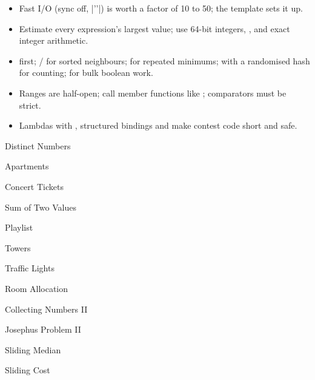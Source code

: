 \begin{summary}
\begin{itemize}
  \item Fast I/O (sync off, \cc|'\n'|) is worth a factor of 10 to 50; the template sets it up.
  \item Estimate every expression's largest value; use 64-bit integers, , and exact integer arithmetic.
  \item {} first; / for sorted neighbours;  for repeated minimums;
         with a randomised hash for counting;  for bulk boolean work.
  \item Ranges are half-open; call member functions like ; comparators must be strict.
  \item Lambdas with \cc{[&]}, structured bindings and  make contest code short and safe.
\end{itemize}
\end{summary}

\begin{practice}
\begin{pplist}
  \item Distinct Numbers
  \item Apartments
  \item Concert Tickets
  \item Sum of Two Values
  \item Playlist
  \item Towers
  \item Traffic Lights
  \item Room Allocation
  \item Collecting Numbers II
\end{pplist}
\begin{pplist}
  \item Josephus Problem II
  \item Sliding Median
  \item Sliding Cost
\end{pplist}
\end{practice}
